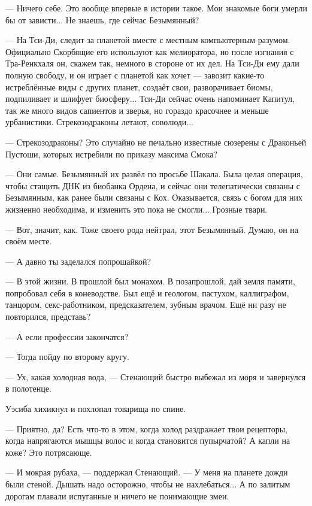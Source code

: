 --- Ничего себе.
Это вообще впервые в истории такое.
Мои знакомые боги умерли бы от зависти...
Не знаешь, где сейчас Безымянный?

--- На Тси-Ди, следит за планетой вместе с местным компьютерным разумом.
Официально Скорбящие его используют как мелиоратора, но после изгнания с Тра-Ренкхаля он, скажем так, немного в стороне от их дел.
На Тси-Ди ему дали полную свободу, и он играет с планетой как хочет --- завозит какие-то истреблённые виды с других планет, создаёт свои, разворачивает биомы, подпиливает и шлифует биосферу...
Тси-Ди сейчас очень напоминает Капитул, так же много видов сапиентов и зверья, но гораздо красочнее и меньше урбанистики.
Стрекозодраконы летают, соволюди...

--- Стрекозодраконы?
Это случайно не печально известные сюзерены с Драконьей Пустоши, которых истребили по приказу максима Смока?

--- Они самые.
Безымянный их развёл по просьбе Шакала.
Была целая операция, чтобы стащить ДНК из биобанка Ордена, и сейчас они телепатически связаны с Безымянным, как ранее были связаны с Кох.
Оказывается, связь с богом для них жизненно необходима, и изменить это пока не смогли...
Грозные твари.

--- Вот, значит, как.
Тоже своего рода нейтрал, этот Безымянный.
Думаю, он на своём месте.

--- А давно ты заделался попрошайкой?

--- В этой жизни.
В прошлой был монахом.
В позапрошлой, дай земля памяти, попробовал себя в коневодстве.
Был ещё и геологом, пастухом, каллиграфом, танцором, секс-работником, предсказателем, зубным врачом.
Ещё ни разу не повторился, представь?

--- А если профессии закончатся?

--- Тогда пойду по второму кругу.

\razd

--- Ух, какая холодная вода, --- Стенающий быстро выбежал из моря и завернулся в полотенце.

Уэсиба хихикнул и похлопал товарища по спине.

--- Приятно, да?
Есть что-то в этом, когда холод раздражает твои рецепторы, когда напрягаются мышцы волос и когда становится пупырчатой?
А капли на коже?
Это потрясающе.

--- И мокрая рубаха, --- поддержал Стенающий.
--- У меня на планете дожди были стеной.
Дышать надо осторожно, чтобы не нахлебаться...
А по залитым дорогам плавали испуганные и ничего не понимающие змеи.


